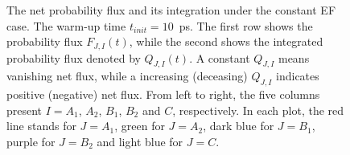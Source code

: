 \documentclass[aip,jcp,a4paper,preprint,onecolumn]{revtex4-1}
\begin{document}
\begin{figure}
  \caption{
    The net probability flux and its integration under the constant EF case.
    The warm-up time $t_{init} = 10$~ps.
    The first row shows the probability flux $F_{J,I}(t)$, while the second
    shows the integrated  probability flux denoted by $Q_{J,I}(t)$.
    A constant $Q_{J,I}$ means vanishing net flux, while a increasing (deceasing)
    $Q_{J,I}$ indicates positive (negative) net flux.
    From left to right, the five
    columns present $I = A_1$, $A_2$, $B_1$, $B_2$ and
    $C$, respectively. In each plot, the red line stands for $J=A_1$,
    green for $J=A_2$, dark blue for $J=B_1$, purple for $J=B_2$ and light blue
    for $J=C$. 
    }
  \label{fig:tmp6}
\end{figure}

\end{document}
